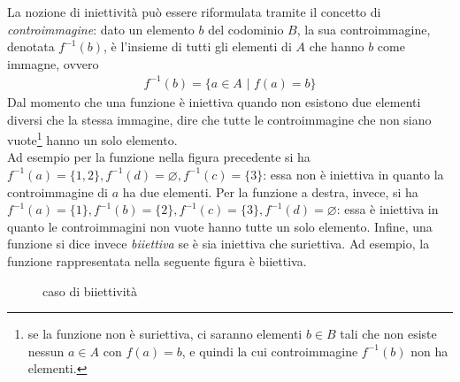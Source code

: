 \documentclass{book}
\theoremstyle{definition}
\theoremstyle{plain}
\begin{document}
La nozione di iniettività può essere riformulata tramite il concetto di \textit{controimmagine}: dato
un elemento $b$ del codominio $B$, la sua controimmagine, denotata $f^{-1}(b)$, è l'insieme di tutti gli
elementi di $A$ che hanno $b$ come immagne, ovvero
\begin{eqnarray*}
  f^{-1}(b)=\{a\in A \text{ | } f(a)=b\}
\end{eqnarray*}
Dal momento che una funzione è iniettiva quando non esistono due elementi diversi che la stessa immagine,
dire che tutte le controimmagine che non siano vuote\footnote{se la funzione non è suriettiva, ci
  saranno elementi $b\in B$ tali che non esiste nessun $a\in A$ con $f(a)=b$, e quindi la cui
  controimmagine $f^{-1}(b)$ non ha elementi.} hanno un solo elemento.\\
Ad esempio per la funzione nella figura precedente si ha $f^{-1}(a)=\{1,2\},f^{-1}(d)=\diameter,
f^{-1}(c)=\{3\}$: essa non è iniettiva in quanto la controimmagine di $a$ ha due elementi. Per la
funzione a destra, invece, si ha $f^{-1}(a)=\{1\},f^{-1}(b)=\{2\}, f^{-1}(c)=\{3\},f^{-1}(d)=\diameter$:
essa è iniettiva in quanto le controimmagini non vuote hanno tutte un solo elemento. Infine, una funzione
si dice invece \textit{biiettiva} se è sia iniettiva che suriettiva. Ad esempio, la funzione
rappresentata nella seguente figura è biiettiva.
\clearpage
\begin{figure}[ht!]
  \centering
  \resizebox{10cm}{!}{}
  \caption{caso di biiettività}
  \label{fig:ricgendelfab3}
\end{figure}
\end{document}
